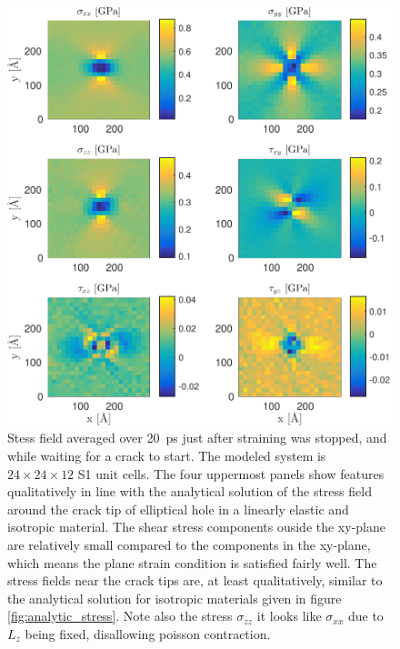 \begin{figure}
\centering
\includegraphics[width=\textwidth]{../figures/thesis/stressfield_avg_wait_for_crack.pdf}
\caption{Stess field averaged over \SI{20}{\pico\second} just after straining was stopped, and while waiting for a crack to start. The modeled system is $24\times 24\times 12$ S1 unit cells. The four uppermost panels show features qualitatively in line with the analytical solution of the stress field around the crack tip of elliptical hole in a linearly elastic and isotropic material. The shear stress components ouside the xy-plane are relatively small compared to the components in the xy-plane, which means the plane strain condition is satisfied fairly well. The stress fields near the crack tips are, at least qualitatively, similar to the analytical solution for isotropic materials given in figure \ref{fig:analytic_stress}. Note also the stress $\sigma_{zz}$ it looks like $\sigma_{xx}$ due to $L_z$ being fixed, disallowing poisson contraction.}
\label{fig:stressfield_avg_wait_for_crack}
\end{figure}


